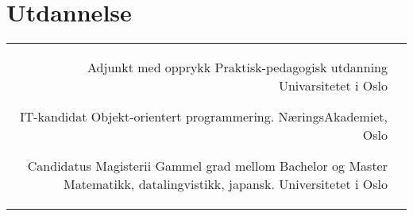 \documentclass[10pt]{article} %
\begin{document}
\begin{paracol}{2}
\begin{supertabular}{rl}
\end{supertabular}





\section{Utdannelse} 





\begin{supertabular}{rl} %

	
	{Adjunkt med opprykk} %
	{Praktisk-pedagogisk utdanning} %
	{} %
	{Univarsitetet i Oslo} %
	
	{IT-kandidat} %
	{} %
	{Objekt-orientert programmering.} %
	{NæringsAkademiet, Oslo} %
	
	{Candidatus Magisterii} %
	{Gammel grad mellom Bachelor og Master} %
	{Matematikk, datalingvistikk, japansk.} %
	{Universitetet i Oslo} %
	


\end{supertabular}




\end{paracol}
\end{document}

